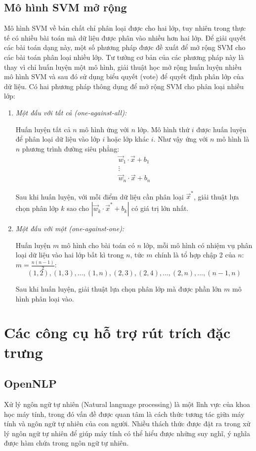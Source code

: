 \subsection*{Mô hình SVM mở rộng}
Mô hình SVM về bản chất chỉ phân loại được cho hai lớp, tuy nhiên trong thực tế có nhiều bài toán mà dữ liệu được phân vào nhiều hơn hai lớp. Để giải quyết các bài toán dạng này, một số phương pháp được đề xuất để mở rộng SVM cho các bài toán phân loại nhiều lớp. Tư tưởng cơ bản của các phương pháp này là thay vì chỉ huấn luyện một mô hình, giải thuật học mở rộng huấn luyện nhiều mô hình SVM và sau đó sử dụng biểu quyết (vote) để quyết định phân lớp của dữ liệu. Có hai phương pháp thông dụng để mở rộng SVM cho phân loại nhiều lớp:
\begin{enumerate}
\item \emph{Một đấu với tất cả (one-against-all):}

Huấn luyện tất cả $n$ mô hình ứng với $n$ lớp. Mô hình thứ $i$ được huấn luyện để phân loại dữ liệu vào lớp $i$ hoặc lớp khác $i$. Như vậy ứng với $n$ mô hình là $n$ phương trình đường siêu phẳng:
\[
\begin{matrix}
\vec{w}_1\cdot\vec{x}+b_1\\
\vdots\\
\vec{w}_n\cdot\vec{x}+b_n
\end{matrix}
\]

Sau khi huấn luyện, với mỗi điểm dữ liệu cần phân loại $\vec{x}^*$, giải thuật lựa chọn phân lớp $k$ sao cho $|\vec{w}_k\cdot\vec{x}^*+b_k|$ có giá trị lớn nhất.
\item \emph{Một đấu với một (one-against-one):}

Huấn luyện $m$ mô hình cho bài toán có $n$ lớp, mỗi mô hình có nhiệm vụ phân loại dữ liệu vào hai lớp bất kì trong $n$, tức $m$ chính là tổ hợp chập 2 của $n$: $m=\frac{n(n-1)}{2}$:\[(1,2),(1,3),\dots,(1,n),(2,3),(2,4),\dots,(2,n),\dots,(n-1,n)\]

Sau khi huấn luyện, giải thuật lựa chọn phân lớp mà được phần lớn $m$ mô hình phân loại vào.
\end{enumerate}

\section{Các công cụ hỗ trợ rút trích đặc trưng} \label{tools}

\subsection*{OpenNLP}
Xử lý ngôn ngữ tự nhiên (Natural language processing) là một lĩnh vực của khoa học máy tính, trong đó vấn đề được quan tâm là cách thức tương tác giữa máy tính và ngôn ngữ tự nhiên của con người. Nhiều thách thức được đặt ra trong xử lý ngôn ngữ tự nhiên để giúp máy tính có thể hiểu được những suy nghĩ, ý nghĩa được hàm chứa trong ngôn ngữ tự nhiên.


